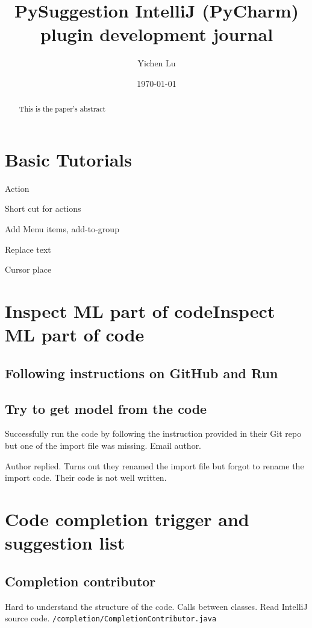 \documentclass[11pt,a4paper]{article}
\title{PySuggestion IntelliJ (PyCharm) plugin development journal}
\author{Yichen Lu}
\date{\today}
\begin{document}
\maketitle

\begin{abstract}
This is the paper's abstract
\end{abstract}

\section{Basic Tutorials}
Action

Short cut for actions

Add Menu items, add-to-group

Replace text

Cursor place

\section{Inspect ML part of codeInspect ML part of code}

\subsection{Following instructions on GitHub and Run}

\subsection{Try to get model from the code}
Successfully run the code by following the instruction provided in their Git repo but one of the import file was missing. Email author.

Author replied. Turns out they renamed the import file but forgot to rename the import code. Their code is not well written.

\section{Code completion trigger and suggestion list}

\subsection{Completion contributor}

Hard to understand the structure of the code. Calls between classes.
Read IntelliJ source code. \texttt{/completion/CompletionContributor.java}
\end{document}
